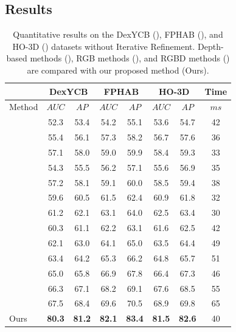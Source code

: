 \subsection{Results}

\begin{table}[h]
\caption{Quantitative results on the DexYCB (\cite{chao2021dexycb}), FPHAB (\cite{garcia2018first}), and HO-3D (\cite{hampali2020honnotate}) datasets without Iterative Refinement. Depth-based methods (\cite{wang20216d, gao20206d, guo2021efficient}), RGB methods (\cite{billings2019silhonet, peng2019pvnet, wang2021gdr, castro2023crt}), and RGBD methods (\cite{wang2019densefusion, he2020pvn3d, he2021ffb6d, wu2023geometric, hong2024rdpn6d, lin2024hipose}) are compared with our proposed method (Ours).}
\label{tab:dataset_without_ir}
\begin{center}
\begin{tabular}{|l|c|c|c|c|c|c|c|} 
\hline
& \multicolumn{2}{c|}{DexYCB} & \multicolumn{2}{c|}{FPHAB} & \multicolumn{2}{c|}{HO-3D} & Time \\
\hline
Method & $AUC$ & $AP$ & $AUC$ & $AP$ & $AUC$ & $AP$ & $ms$ \\  
\hline 
\cite{wang20216d} & 52.3 & 53.4 & 54.2 & 55.1 & 53.6 & 54.7 & 42 \\
\cite{gao20206d} & 55.4 & 56.1 & 57.3 & 58.2 & 56.7 & 57.6 & 36 \\
\cite{guo2021efficient} & 57.1 & 58.0 & 59.0 & 59.9 & 58.4 & 59.3 & 33 \\
\hline 
\cite{billings2019silhonet} & 54.3 & 55.5 & 56.2 & 57.1 & 55.6 & 56.9 & 35 \\
\cite{peng2019pvnet} & 57.2 & 58.1 & 59.1 & 60.0 & 58.5 & 59.4 & 38 \\
\cite{wang2021gdr} & 59.6 & 60.5 & 61.5 & 62.4 & 60.9 & 61.8 & 32 \\
\cite{castro2023crt} & 61.2 & 62.1 & 63.1 & 64.0 & 62.5 & 63.4 & 30 \\
\hline
\cite{wang2019densefusion} & 60.3 & 61.1 & 62.2 & 63.1 & 61.6 & 62.5 & 42 \\
\cite{he2020pvn3d} & 62.1 & 63.0 & 64.1 & 65.0 & 63.5 & 64.4 & 49 \\
\cite{he2021ffb6d} & 63.4 & 64.2 & 65.3 & 66.2 & 64.8 & 65.7 & 51 \\
\cite{wu2023geometric} & 65.0 & 65.8 & 66.9 & 67.8 & 66.4 & 67.3 & 46 \\
\cite{hong2024rdpn6d} & 66.3 & 67.1 & 68.2 & 69.1 & 67.6 & 68.5 & 55 \\
\cite{lin2024hipose} & 67.5 & 68.4 & 69.6 & 70.5 & 68.9 & 69.8 & 65 \\
Ours & \textbf{80.3} & \textbf{81.2} & \textbf{82.1} & \textbf{83.4} & \textbf{81.5} & \textbf{82.6} & 40 \\
\hline
\end{tabular}
\end{center}
\end{table}

